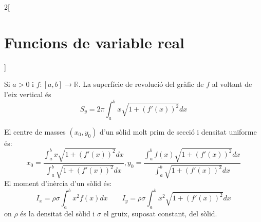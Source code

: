 \documentclass[class=article,10pt,crop=false]{standalone}
\begin{document}
\begin{multicols}{2}[\section{Funcions de variable real}]
\begin{prop}
\end{prop}
\begin{prop}
Si $a>0$ i $f:[a,b]\rightarrow\mathbb{R}$. La superfície de revolució del gràfic de $f$ al voltant de l'eix vertical és $$S_y=2\pi\int_a^bx\sqrt{1+(f'(x))^2}dx$$
\end{prop}
\begin{prop}
El centre de masses $(x_0,y_0)$ d'un sòlid molt prim de secció i densitat uniforme és: $$x_0=\frac{\int_a^bx\sqrt{1+(f'(x))^2}dx}{\int_a^b\sqrt{1+(f'(x))^2}dx},y_0=\frac{\int_a^b f(x)\sqrt{1+(f'(x))^2}dx}{\int_a^b\sqrt{1+(f'(x))^2}dx}$$
El moment d'inèrcia d'un sòlid és: $$I_x=\rho\sigma\int_a^bx^2f(x)dx\qquad I_y=\rho\sigma\int_a^bx^2\sqrt{1+(f'(x))^2}dx$$ on $\rho$ és la densitat del sòlid i $\sigma$ el gruix, suposat constant, del sòlid.
\end{prop}
\end{multicols}
\end{document}
